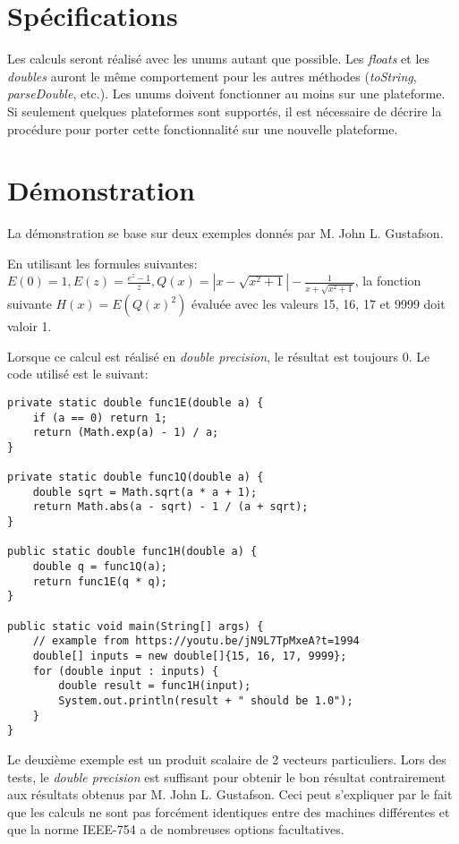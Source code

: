 \section{Spécifications}

Les calculs seront réalisé avec les unums autant que possible. Les \textit{floats} et les \textit{doubles} auront le même comportement pour les autres méthodes (\textit{toString}, \textit{parseDouble}, etc.). Les unums doivent fonctionner au moins sur une plateforme. Si seulement quelques plateformes sont supportés, il est nécessaire de décrire la procédure pour porter cette fonctionnalité sur une nouvelle plateforme.

\section{Démonstration}

La démonstration se base sur deux exemples donnés par M. John L. Gustafson.

En utilisant les formules suivantes: $E(0) = 1, E(z) = \frac{e^z - 1}{z}, Q(x) = |x - \sqrt{x^2 + 1}| - \frac{1}{x+\sqrt{x^2 + 1}}$, la fonction suivante $H(x) = E(Q(x)^2)$ évaluée avec les valeurs 15, 16, 17 et 9999 doit valoir 1.

Lorsque ce calcul est réalisé en \textit{double precision}, le résultat est toujours 0. Le code utilisé est le suivant:

\begin{verbatim}
private static double func1E(double a) {
    if (a == 0) return 1;
    return (Math.exp(a) - 1) / a;
}

private static double func1Q(double a) {
    double sqrt = Math.sqrt(a * a + 1);
    return Math.abs(a - sqrt) - 1 / (a + sqrt);
}

public static double func1H(double a) {
    double q = func1Q(a);
    return func1E(q * q);
}

public static void main(String[] args) {
    // example from https://youtu.be/jN9L7TpMxeA?t=1994
    double[] inputs = new double[]{15, 16, 17, 9999};
    for (double input : inputs) {
        double result = func1H(input);
        System.out.println(result + " should be 1.0");
    }
}
\end{verbatim}

Le deuxième exemple est un produit scalaire de 2 vecteurs particuliers. Lors des tests, le \textit{double precision} est suffisant pour obtenir le bon résultat contrairement aux résultats obtenus par M. John L. Gustafson. Ceci peut s'expliquer par le fait que les calculs ne sont pas forcément identiques entre des machines différentes et que la norme IEEE-754 \cite{ieee-754-2019} a de nombreuses options facultatives.

